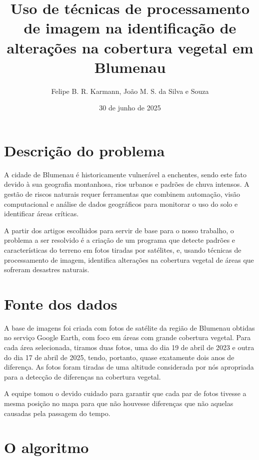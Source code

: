 \documentclass{article}
\author{Felipe B. R. Karmann, João M. S. da Silva e Souza}
\date{30 de junho de 2025}
\title{Uso de técnicas de processamento de imagem na identificação de alterações na cobertura vegetal em Blumenau}
\begin{document}
\maketitle

\section{Descrição do problema}

A cidade de Blumenau é historicamente vulnerável a enchentes, sendo este fato devido à sua geografia montanhosa, rios urbanos e padrões de chuva intensos. A gestão de riscos naturais requer ferramentas que combinem automação, visão computacional e análise de dados geográficos para monitorar o uso do solo e identificar áreas críticas.

A partir dos artigos escolhidos para servir de base para o nosso trabalho, o problema a ser resolvido é a criação de um programa que detecte padrões e características do terreno em fotos tiradas por satélites, e, usando técnicas de processamento de imagem, identifica alterações na cobertura vegetal de áreas que sofreram desastres naturais.

\section{Fonte dos dados}

A base de imagens foi criada com fotos de satélite da região de Blumenau obtidas no serviço Google Earth, com foco em áreas com grande cobertura vegetal. Para cada área selecionada, tiramos duas fotos, uma do dia 19 de abril de 2023 e outra do dia 17 de abril de 2025, tendo, portanto, quase exatamente dois anos de diferença. As fotos foram tiradas de uma altitude considerada por nós apropriada para a detecção de diferenças na cobertura vegetal.

A equipe tomou o devido cuidado para garantir que cada par de fotos tivesse a mesma posição no mapa para que não houvesse diferenças que não aquelas causadas pela passagem do tempo.

\section{O algoritmo}
\end{document}
